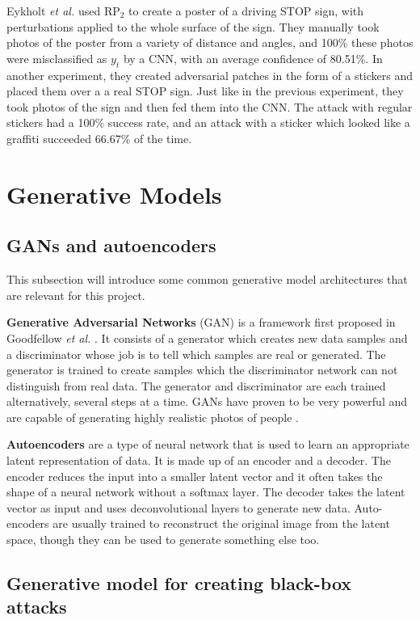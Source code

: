 Eykholt \textit{et al.} used $\textrm{RP}_2$ to create a poster of a driving STOP sign, with perturbations applied to the whole surface of the sign. They manually took photos of the poster from a variety of distance and angles, and 100\% these photos were misclassified as $y_t$ by a CNN, with an average confidence of 80.51\%. In another experiment, they created adversarial patches in the form of a stickers and placed them over a a real STOP sign. Just like in the previous experiment, they took photos of the sign and then fed them into the CNN. The attack with regular stickers had a 100\% success rate, and an attack with a sticker which looked like a graffiti succeeded 66.67\% of the time.

\section{Generative Models}
    \label{sec:generative_models}
    
\subsection{GANs and autoencoders}
    
This subsection will introduce some common generative model architectures that are relevant for this project.

\textbf{Generative Adversarial Networks} (GAN) is a framework first proposed in Goodfellow \textit{et al.} \cite{gans}. It consists of a generator which creates new data samples and a discriminator whose job is to tell which samples are real or generated. The generator is trained to create samples which the discriminator network can not distinguish from real data. The generator and discriminator are each trained alternatively, several steps at a time. GANs have proven to be very powerful and are capable of generating highly realistic photos of people \cite{styleGAN}.

\textbf{Autoencoders} are a type of neural network that is used to learn an appropriate latent representation of data. It is made up of an encoder and a decoder. The encoder reduces the input into a smaller latent vector and it often takes the shape of a neural network without a softmax layer. The decoder takes the latent vector as input and uses deconvolutional layers to generate new data. Auto-encoders are usually trained to reconstruct the original image from the latent space, though they can be used to generate something else too.

\subsection{Generative model for creating black-box attacks}
    \label{subsubsec:zheng}


